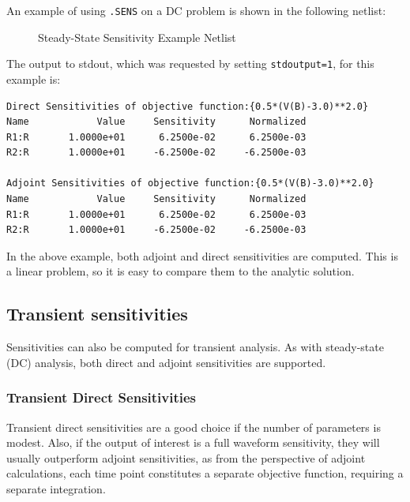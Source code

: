 An example of using \texttt{.SENS} on a DC problem is shown in the
following netlist:
\begin{figure}[htbp]
  \begin{centering}
\caption[Steady-State Sensitivity Example Netlist]
{Steady-State Sensitivity Example Netlist \label{DC_Sensitivity_Netlist} }
\end{centering}
\end{figure}
The output to stdout, which was requested by setting \texttt{stdoutput=1}, for this example is:
\begin{verbatim}
Direct Sensitivities of objective function:{0.5*(V(B)-3.0)**2.0}
Name	        Value	  Sensitivity	   Normalized
R1:R	   1.0000e+01	   6.2500e-02	   6.2500e-03
R2:R	   1.0000e+01	  -6.2500e-02	  -6.2500e-03

Adjoint Sensitivities of objective function:{0.5*(V(B)-3.0)**2.0}
Name	        Value	  Sensitivity	   Normalized
R1:R	   1.0000e+01	   6.2500e-02	   6.2500e-03
R2:R	   1.0000e+01	  -6.2500e-02	  -6.2500e-03
\end{verbatim}
In the above example, both adjoint and direct sensitivities are
computed.  This is a linear problem, so it is easy to compare them to
the analytic solution.
\subsection{Transient sensitivities}
Sensitivities can also be computed for transient analysis.  As with
steady-state (DC) analysis, both direct and adjoint sensitivities are
supported.

\subsubsection{Transient Direct Sensitivities}
Transient direct sensitivities are a good choice if the number of
parameters is modest.  Also, if the output of interest is a full
waveform sensitivity, they will usually outperform adjoint
sensitivities, as from the perspective of adjoint calculations, each
time point constitutes a separate objective function, requiring a
separate integration.

